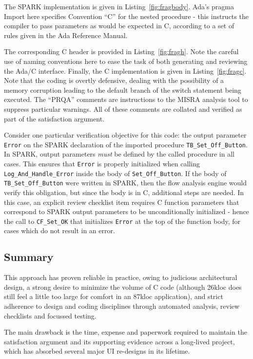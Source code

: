 \documentclass{llncs}
\newcommand{\spark}{SPARK\xspace}
\begin{document}
The \spark implementation is given in Listing~\ref{fig:fragbody}.  Ada's pragma Import
here specifies Convention ``C'' for the nested procedure - this instructs the
compiler to pass parameters as would be expected in C, according to a set of
rules given in the Ada Reference Manual.

The corresponding C header is provided in Listing~\ref{fig:fragh}.  Note the
careful use of naming conventions here to ease the task of both generating and
reviewing the Ada/C interface.  Finally, the C implementation is given in
Listing~\ref{fig:fragc}.  Note that the coding is overtly defensive, dealing with
the possibility of a memory corruption leading to the default branch of the
switch statement being executed.  The ``PRQA'' comments are instructions to
the MISRA analysis tool to suppress particular warnings.  All of these
comments are collated and verified as part of the satisfaction argument.

Consider one particular verification objective for this code: the output parameter
\texttt{Error} on the \spark declaration of the imported procedure \texttt{TB\_Set\_Off\_Button}.
In \spark, output parameters \emph{must} be defined by the called procedure in
all cases. This ensures that \texttt{Error} is properly initialized when calling
\texttt{Log\_And\_Handle\_Error} inside the body of \texttt{Set\_Off\_Button}.
If the body of \texttt{TB\_Set\_Off\_Button} were written in \spark, then the flow analysis engine would
verify this obligation, but since the body is in C, additional steps are needed.
In this case, an explicit review checklist item requires C function parameters
that correspond to \spark output parameters to be unconditionally initialized - hence the call to \texttt{CF\_Set\_OK} that initializes \texttt{Error} at the top of the function
body, for cases which do not result in an error.

\subsection{Summary}

This approach has proven reliable in practice, owing to
judicious architectural design, a strong desire to
minimize the volume of C code (although 26kloc does
still feel a little too large for comfort in an 87kloc
application), and strict adherence to design and
coding disciplines through automated analysis,
review checklists and focussed testing.

The main drawback is the time, expense and paperwork
required to maintain the satisfaction argument and its
supporting evidence across a long-lived project, which
has absorbed several major UI re-designs in its lifetime.
\end{document}
